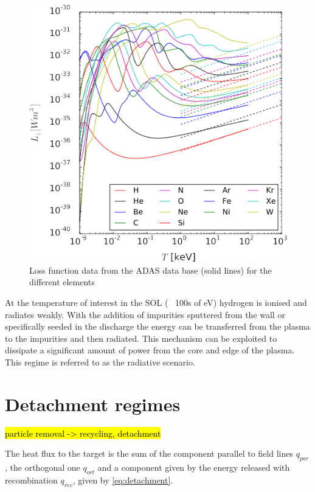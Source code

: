 \begin{figure}
	\centering
	\includegraphics[width=\linewidth]{Chapters/chapter1/figs/loss curve.png}
	\caption{Loss function data from the ADAS data base (solid lines) for the different elements \cite{Lux2015}}
	\label{fig:loss_curve}
\end{figure}

At the temperature of interest in the SOL (~ 100s of eV) hydrogen is ionised and radiates weakly. With the addition of impurities sputtered from the wall or specifically seeded in the discharge the energy can be transferred from the plasma to the impurities and then radiated. This mechanism can be exploited to dissipate a significant amount of power from the core and edge of the plasma. This regime is referred to as the radiative scenario.


\section{Detachment regimes}
\hl{particle removal -> recycling, detachment}

The heat flux to the target is the sum of the component parallel to field lines $q_{par}$, the orthogonal one $q_{ort}$ and a component given by the energy released with recombination $q_{rec}$, given by  \autoref{eq:detachment}.

